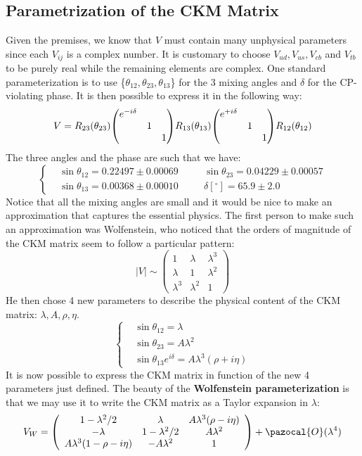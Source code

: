 \documentclass[../main.tex]{subfiles}
\begin{document}
\subsection{Parametrization of the CKM Matrix}
Given the premises, we know that $V$ must contain many unphysical parameters since each $V_{ij}$ is a complex number. It is customary to choose $V_{ud}, V_{us}, V_{cb}$ and $V_{tb}$ to be purely real while the remaining elements are complex. One standard parameterization is to use \{$\theta_{12},\theta_{23},\theta_{13}$\} for the 3 mixing angles and $\delta$ for the CP-violating phase. It is then possible to express it in the following way:
\[
V=R_{23}(\theta_{23})\mqty(\dmat{e^{-i\delta},1,1})R_{13}(\theta_{13})\mqty(\dmat{e^{+i\delta},1,1})R_{12}(\theta_{12})
\]
The three angles and the phase are such that we have:
\[
\left\{
\begin{aligned}
&\sin\theta_{12}=0.22497\pm0.00069\quad && \sin\theta_{23}=0.04229\pm0.00057\\
&\sin\theta_{13}=0.00368\pm0.00010 \quad && \delta[^\circ]=65.9\pm2.0
\end{aligned}
\right.
\]
Notice that all the mixing angles are small and it would be nice to make an approximation that captures the essential physics. The first person to make such an approximation was Wolfenstein, who noticed that the orders of magnitude of the CKM matrix seem to follow a particular pattern:
\[
|V|\sim
\left(\begin{array}{ccc}
    1 & \lambda & \lambda^3 \\
    \lambda & 1 & \lambda^2 \\
    \lambda^3 & \lambda^2 & 1
\end{array}\right)
\]
He then chose 4 new parameters to describe the physical content of the CKM matrix: $\lambda, A, \rho, \eta$.
\[
\left\{
\begin{aligned}
&\sin\theta_{12}=\lambda\\
&\sin\theta_{23}=A\lambda^2\\
&\sin\theta_{13}e^{i\delta}=A\lambda^3(\rho+i\eta)
\end{aligned}
\right.
\]
It is now possible to express the CKM matrix in function of the new 4 parameters just defined. The beauty of the \textbf{Wolfenstein parameterization} is
that we may use it to write the CKM matrix as a Taylor expansion in $\lambda$:
\[
V_W=\left(\begin{array}{ccc}
    1-\lambda^2/2 & \lambda & A\lambda^3(\rho-i\eta) \\
    -\lambda & 1-\lambda^2/2 & A\lambda^2 \\
    A\lambda^3(1-\rho-i\eta) & -A\lambda^2 & 1
\end{array}\right)
+\pazocal{O}(\lambda^4)
\]
\end{document}
